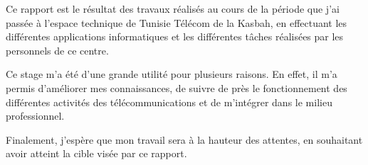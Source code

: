 \documentclass[12pt,a4paper]{report}
\begin{document}
Ce rapport est le résultat des travaux réalisés au cours de la période que j'ai
passée à l'espace technique de Tunisie Télécom de la Kasbah, en effectuant les
différentes applications informatiques et les différentes tâches réalisées par
les personnels de ce centre.

Ce stage m'a été d'une grande utilité pour plusieurs raisons. En effet, il m'a
permis d'améliorer mes connaissances, de suivre de près le fonctionnement des
différentes activités des télécommunications et de m'intégrer dans le milieu
professionnel.

Finalement, j'espère que mon travail sera à la hauteur des attentes, en
souhaitant avoir atteint la cible visée par ce rapport.
\end{document}
